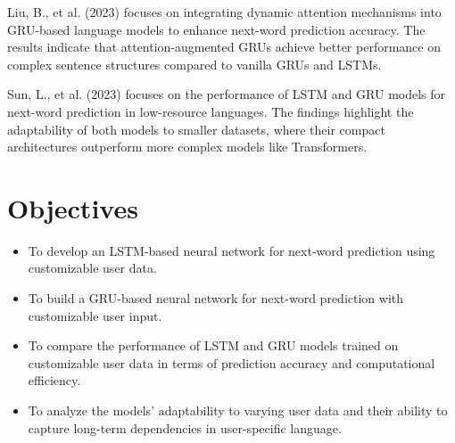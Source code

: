 \documentclass[conference]{IEEEtran}
\begin{document}
Liu, B., et al. (2023) focuses on integrating dynamic attention mechanisms into GRU-based language models to enhance next-word prediction accuracy. The results indicate that attention-augmented GRUs achieve better performance on complex sentence structures compared to vanilla GRUs and LSTMs.

Sun, L., et al. (2023) focuses on the performance of LSTM and GRU models for next-word prediction in low-resource languages. The findings highlight the adaptability of both models to smaller datasets, where their compact architectures outperform more complex models like Transformers.


\section{Objectives}
\begin{itemize}
    \item To develop an LSTM-based neural network for next-word prediction using customizable user data.
    \item To build a GRU-based neural network for next-word prediction with customizable user input.
    \item To compare the performance of LSTM and GRU models trained on customizable user data in terms of prediction accuracy and computational efficiency.
    \item To analyze the models' adaptability to varying user data and their ability to capture long-term dependencies in user-specific language.
\end{itemize}
\end{document}
